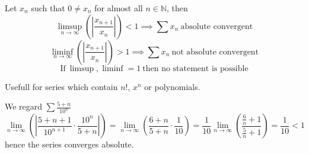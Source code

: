 \begin{proposition}\label{pro:ratio_test}
   Let \(x_n\) such that \(0 \neq x_n\) for almost all \(n \in \mathbb{N}\), then
   \[\limsup_{n \to \infty} \left(\left|\frac{x_{n+1}}{x_n}\right|\right) < 1 \implies \sum x_n~\text{absolute convergent}\]
   \[\liminf_{n \to \infty} \left(\left|\frac{x_{n+1}}{x_n}\right|\right) > 1 \implies \sum x_n~\text{not absolute convergent}\]
   \[\text{If}~\limsup, \liminf = 1~\text{then no statement is possible}\]
\end{proposition}
\begin{remark}[Tips]
   Usefull for series which contain \(n!\), \(x^n\) or polynomials.
\end{remark}
\begin{example}
   We regard \(\sum \frac{5 + n}{10^n}\)
   \[\lim_{n \to \infty}\left(\left\lvert\frac{5 + n + 1}{10^{n+1}} \cdot \frac{10^n}{5 + n}\right\rvert\right) = \lim_{n \to \infty}\left(\frac{6+n}{5+n} \cdot \frac{1}{10}\right) = \frac{1}{10} \lim_{n \to \infty}\left(\frac{\frac{6}{n} + 1}{\frac{5}{n}+1}\right) = \frac{1}{10} < 1\]
   hence the series converges absolute.
\end{example}

